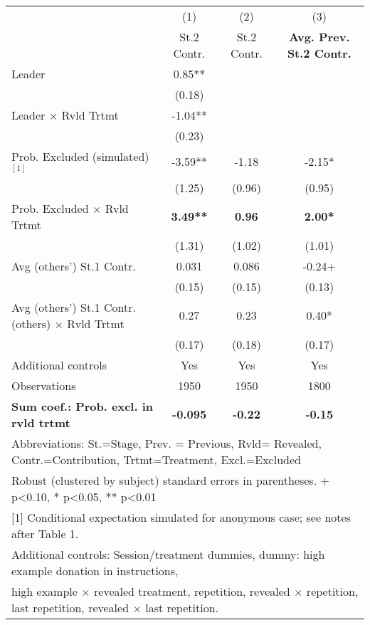 {
\def\sym#1{\ifmmode^{#1}\else\(^{#1}\)\fi}
\begin{tabular}{l*{3}{c}}
\hline
                &\multicolumn{1}{c}{(1)}&\multicolumn{1}{c}{(2)}&\multicolumn{1}{c}{(3)}\\
                &\multicolumn{1}{c}{St.2 Contr.}&\multicolumn{1}{c}{St.2 Contr.}&\multicolumn{1}{c}{\textbf{Avg. Prev. St.2 Contr.}}\\
\hline
Leader          &     0.85**&           &           \\
                &   (0.18)  &           &           \\
Leader $\times$ Rvld Trtmt&    -1.04**&           &           \\
                &   (0.23)  &           &           \\
Prob. Excluded (simulated)$^{[1]}$&    -3.59**&    -1.18  &    -2.15* \\
                &   (1.25)  &   (0.96)  &   (0.95)  \\
Prob. Excluded $\times$ Rvld Trtmt&     \textbf{3.49**}&     \textbf{0.96}  &     \textbf{2.00*} \\
                &   (1.31)  &   (1.02)  &   (1.01)  \\
Avg (others') St.1 Contr.&    0.031  &    0.086  &    -0.24+ \\
                &   (0.15)  &   (0.15)  &   (0.13)  \\
Avg (others') St.1 Contr. (others) $\times$ Rvld Trtmt&     0.27  &     0.23  &     0.40* \\
                &   (0.17)  &   (0.18)  &   (0.17)  \\
Additional controls &      Yes  &      Yes  &      Yes  \\
\hline
Observations    &     1950  &     1950  &     1800  \\
\textbf{Sum coef.: Prob. excl. in rvld trtmt} &    \textbf{-0.095}  &     \textbf{-0.22}  &     \textbf{-0.15} \\
\hline

\multicolumn{4}{l}{\footnotesize Abbreviations:  St.=Stage, Prev. = Previous, Rvld= Revealed, Contr.=Contribution, Trtmt=Treatment, Excl.=Excluded}\\
\multicolumn{4}{l}{\footnotesize Robust (clustered by subject) standard errors in parentheses. + p<0.10, * p<0.05, ** p<0.01}\\
\multicolumn{4}{l}{\footnotesize [1] Conditional expectation simulated for anonymous case; see notes after Table 1.}\\
\multicolumn{4}{l}{\footnotesize Additional controls: Session/treatment dummies, dummy: high example donation in instructions,}\\
\multicolumn{4}{l}{\footnotesize high example $\times$ revealed treatment, repetition, revealed $\times$ repetition, last repetition, revealed $\times$ last repetition.}\\
\end{tabular}
}
